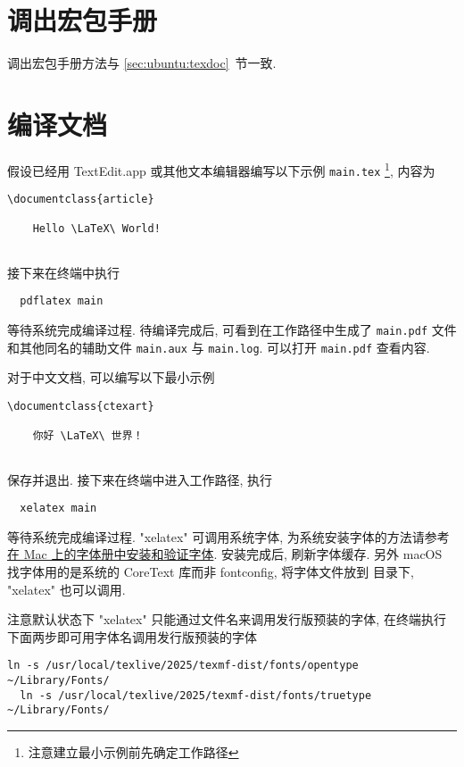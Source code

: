 \section{调出宏包手册}

调出宏包手册方法与 \ref{sec:ubuntu:texdoc}~节一致.

\section{编译文档}

假设已经用 TextEdit.app 或其他文本编辑器编写以下示例 \texttt{main.tex}%
\footnote{注意建立最小示例前先确定工作路径},
内容为
\begin{lstlisting}[language = mwe]
  \documentclass{article}
  
    Hello \LaTeX\ World!
  
\end{lstlisting}
接下来在\textsf{终端}中执行
\begin{lstlisting}
  pdflatex main
\end{lstlisting}
等待系统完成编译过程.
待编译完成后, 可看到在工作路径中生成了 \texttt{main.pdf}
文件和其他同名的辅助文件 \texttt{main.aux} 与 \texttt{main.log}.
可以打开 \texttt{main.pdf} 查看内容.

对于中文文档, 可以编写以下最小示例%
\begin{lstlisting}[language = mwe]
  \documentclass{ctexart}
  
    你好 \LaTeX\ 世界！
  
\end{lstlisting}
保存并退出.
接下来在\textsf{终端}中进入工作路径,
执行
\begin{lstlisting}
  xelatex main
\end{lstlisting}
等待系统完成编译过程.
"xelatex" 可调用系统字体,
为系统安装字体的方法请参考%
\href{https://support.apple.com/zh-cn/guide/font-book/fntbk1000/mac}{在 Mac 上的字体册中安装和验证字体}.
安装完成后, 刷新字体缓存.
另外 macOS 找字体用的是系统的 CoreText 库而非 fontconfig,
将字体文件放到  目录下,
"xelatex" 也可以调用.

注意默认状态下 "xelatex" 只能通过文件名来调用发行版预装的字体,
在\textsf{终端}执行下面两步即可用字体名调用发行版预装的字体
\begin{lstlisting}[deletekeywords = local]
  ln -s /usr/local/texlive/2025/texmf-dist/fonts/opentype ~/Library/Fonts/
  ln -s /usr/local/texlive/2025/texmf-dist/fonts/truetype ~/Library/Fonts/
\end{lstlisting}

